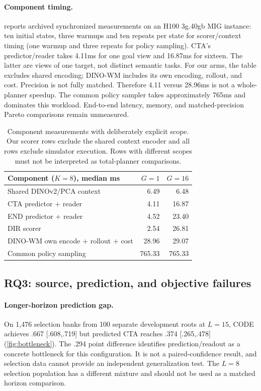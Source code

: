 \paragraph{Component timing.}
 reports archived synchronized measurements on an H100 3g.40gb MIG instance: ten initial states, three warmups and ten repeats per state for scorer/context timing (one warmup and three repeats for policy sampling). CTA's predictor/reader takes 4.11ms for one goal view and 16.87ms for sixteen. The latter are views of one target, not distinct semantic tasks. For our arms, the table excludes shared encoding; DINO-WM includes its own encoding, rollout, and cost. Precision is not fully matched. Therefore 4.11 versus 28.96ms is not a whole-planner speedup. The common policy sampler takes approximately 765ms and dominates this workload. End-to-end latency, memory, and matched-precision Pareto comparisons remain unmeasured.

\begin{table}[t]
\centering\small
\begin{tabular}{lrr}
\toprule
Component ($K=8$), median ms & $G=1$ & $G=16$ \\
\midrule
Shared DINOv2/PCA context & 6.49 & 6.48 \\
CTA predictor + reader & 4.11 & 16.87 \\
END predictor + reader & 4.52 & 23.40 \\
DIR scorer & 2.54 & 26.81 \\
DINO-WM own encode + rollout + cost & 28.96 & 29.07 \\
Common policy sampling & 765.33 & 765.33 \\
\bottomrule
\end{tabular}
\caption{Component measurements with deliberately explicit scope. Our scorer rows exclude the shared context encoder and all rows exclude simulator execution. Rows with different scopes must not be interpreted as total-planner comparisons.}
\label{tab:timing}
\end{table}

\subsection{RQ3: source, prediction, and objective failures}
\label{sec:diagnostics}
\paragraph{Longer-horizon prediction gap.}
On 1,476 selection banks from 100 separate development roots at $L=15$, CODE achieves .667 [.608,.719] but predicted CTA reaches .374 [.265,.478] (\cref{fig:bottleneck}). The .294 point difference \mbox{identifies} prediction/readout as a concrete bottleneck for this configuration. It is not a paired-confidence result, and selection data cannot provide an independent generalization test. The $L=8$ selection population has a different mixture and should not be used as a matched horizon comparison.

